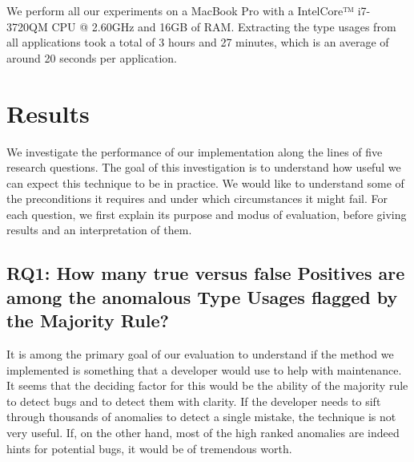 We perform all our experiments on a MacBook Pro with a Intel\textregistered Core™ i7-3720QM CPU @ 2.60GHz and 16GB of RAM.
Extracting the type usages from all applications took a total of 3 hours and 27 minutes, which is an average of around 20 seconds per application.


\section{Results}


We investigate the performance of our implementation along the lines of five research questions.
The goal of this investigation is to understand how useful we can expect this technique to be in practice.
We would like to understand some of the preconditions it requires and under which circumstances it might fail.
For each question, we first explain its purpose and modus of evaluation, before giving results and an interpretation of them.

\subsection{RQ1: How many true versus false Positives are among the anomalous Type Usages flagged by the Majority Rule?}

It is among the primary goal of our evaluation to understand if the method we implemented is something that a developer would use to help with maintenance.
It seems that the deciding factor for this would be the ability of the majority rule to detect bugs and to detect them with clarity.
If the developer needs to sift through thousands of anomalies to detect a single mistake, the technique is not very useful.
If, on the other hand, most of the high ranked anomalies are indeed hints for potential bugs, it would be of tremendous worth.

